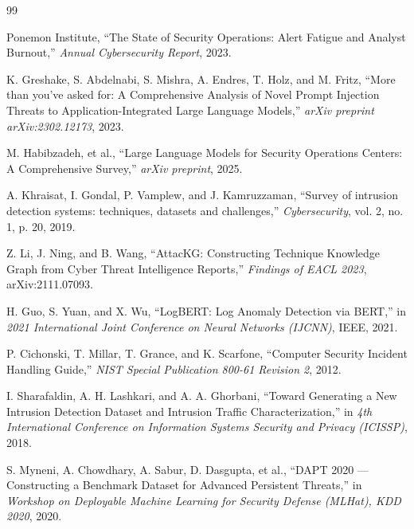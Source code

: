 \documentclass[12pt,a4paper]{article}
\begin{document}
\newpage
{}
\begin{thebibliography}{99}

    Ponemon Institute, ``The State of Security Operations: Alert Fatigue and Analyst Burnout,'' \emph{Annual Cybersecurity Report}, 2023.

    K. Greshake, S. Abdelnabi, S. Mishra, A. Endres, T. Holz, and M. Fritz, ``More than you've asked for: A Comprehensive Analysis of Novel Prompt Injection Threats to Application-Integrated Large Language Models,'' \emph{arXiv preprint arXiv:2302.12173}, 2023.

    M. Habibzadeh, et al., ``Large Language Models for Security Operations Centers: A Comprehensive Survey,'' \emph{arXiv preprint}, 2025.

    A. Khraisat, I. Gondal, P. Vamplew, and J. Kamruzzaman, ``Survey of intrusion detection systems: techniques, datasets and challenges,'' \emph{Cybersecurity}, vol. 2, no. 1, p. 20, 2019.

    Z. Li, J. Ning, and B. Wang, ``AttacKG: Constructing Technique Knowledge Graph from Cyber Threat Intelligence Reports,'' \emph{Findings of EACL 2023}, arXiv:2111.07093.

    H. Guo, S. Yuan, and X. Wu, ``LogBERT: Log Anomaly Detection via BERT,'' in \emph{2021 International Joint Conference on Neural Networks (IJCNN)}, IEEE, 2021.

    P. Cichonski, T. Millar, T. Grance, and K. Scarfone, ``Computer Security Incident Handling Guide,'' \emph{NIST Special Publication 800-61 Revision 2}, 2012.

    I. Sharafaldin, A. H. Lashkari, and A. A. Ghorbani, ``Toward Generating a New Intrusion Detection Dataset and Intrusion Traffic Characterization,'' in \emph{4th International Conference on Information Systems Security and Privacy (ICISSP)}, 2018.

    S. Myneni, A. Chowdhary, A. Sabur, D. Dasgupta, et al., ``DAPT 2020 --- Constructing a Benchmark Dataset for Advanced Persistent Threats,'' in \emph{Workshop on Deployable Machine Learning for Security Defense (MLHat), KDD 2020}, 2020.


\end{thebibliography}
\end{document}
